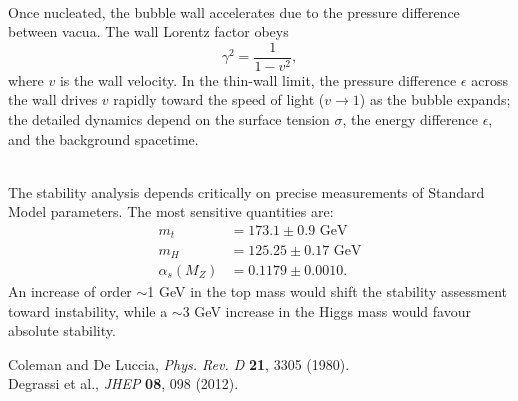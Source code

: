 \begin{technical}
\\[0.5em]
Once nucleated, the bubble wall accelerates due to the pressure difference between vacua. The wall Lorentz factor obeys
$$
\gamma^2 = \frac{1}{1-v^2},
$$
where $v$ is the wall velocity. In the thin-wall limit, the pressure difference $\epsilon$ across the wall drives $v$ rapidly toward the speed of light ($v \to 1$) as the bubble expands; the detailed dynamics depend on the surface tension $\sigma$, the energy difference $\epsilon$, and the background spacetime.

\\[0.5em]
The stability analysis depends critically on precise measurements of Standard Model parameters. The most sensitive quantities are:
\begin{align*}
m_t &= 173.1 \pm 0.9 \text{ GeV} \\
m_H &= 125.25 \pm 0.17 \text{ GeV} \\
\alpha_s(M_Z) &= 0.1179 \pm 0.0010.
\end{align*}
An increase of order $\sim$1 GeV in the top mass would shift the stability assessment toward instability, while a $\sim$3 GeV increase in the Higgs mass would favour absolute stability.

\techref
{\footnotesize
Coleman and De Luccia, \textit{Phys. Rev. D} \textbf{21}, 3305 (1980).\\
Degrassi et al., \textit{JHEP} \textbf{08}, 098 (2012).
}
\end{technical}
